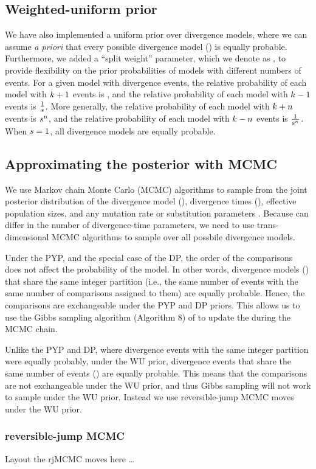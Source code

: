 \subsection{Weighted-uniform prior}
We have also implemented a uniform prior over divergence models, where we can
assume \emph{a priori} that every possible divergence model (\etimesets) is
equally probable.
Furthermore, we added a ``split weight'' parameter, which we denote as
\splitweight, to provide flexibility on the prior probabilities of
models with different numbers of events.
For a given model with \nevents divergence events, the relative probability
of each model with $k_{} + 1$ events is \splitweight,
and the relative probability of each model with $k_{} - 1$ events is
$\frac{1}{s}$.
More generally, the relative probability of each model with
$k_{} + n$
events is
$s{}^n$,
and the relative probability of each model with
$k_{} - n$
events is
$\frac{1}{s{}^n}$.
When $s = 1$, all divergence models are equally probable.

\subsection{Approximating the posterior with MCMC}

We use Markov chain Monte Carlo (MCMC) algorithms to sample from
the joint posterior distribution of the divergence model (\etimesets),
divergence times (\etimes), effective population sizes, and
any mutation rate or substitution parameters
\cite{Oaks2018ecoevolity,Oaks2019codemog}.
Because \etimesets can differ in the number of divergence-time parameters, we
need to use trans-dimensional MCMC algorithms to sample over all possbile
divergence models.

Under the PYP, and the special case of the DP, the order of the comparisons
does not affect the probability of the model.
In other words, divergence models (\etimesets) that share the same integer
partition (i.e., the same number of events with the same number of comparisons
assigned to them) are equally probable.
Hence, the comparisons are exchangeable under the PYP and DP priors.
This allows us to use the Gibbs sampling algorithm (Algorithm 8) of
\citet{Neal2000} to update the \etimesets during the MCMC chain.

Unlike the PYP and DP, where divergence events with the same
integer partition were equally probably, under the
WU prior, divergence events that share the same number of events (\nevents) are
equally probable.
This means that the comparisons are not exchangeable under the WU prior, and
thus Gibbs sampling will not work to sample \etimesets under the WU prior.
Instead we use reversible-jump MCMC moves under the WU prior.

\subsubsection{reversible-jump MCMC}
Layout the rjMCMC moves here \ldots
